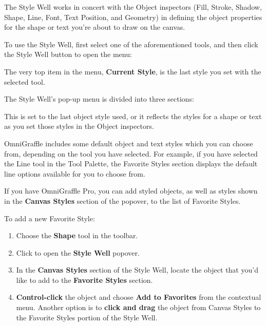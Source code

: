 \documentclass[../main.tex]{subfiles}
\begin{document}
The Style Well works in concert with the Object inspectors (Fill, Stroke, Shadow, Shape, Line,
Font, Text Position, and Geometry) in defining the object properties for the shape or text
you're about to draw on the canvas.

To use the Style Well, first select one of the aforementioned tools, and then click the Style
Well button to open the menu:


The very top item in the menu, \textbf{Current Style}, is the last style you set with the
selected tool.

The Style Well's pop-up menu is divided into three sections:

\begin{description}[style=nextline]
  \item[{\textbf{Current Style}}] This is set to the last object style used, or it reflects the
    styles for a shape or text as you set those styles in the Object inspectors.
  \item[{\textbf{Favorite Styles}}] OmniGraffle includes some default object and text styles
    which you can choose from, depending on the tool you have selected. For example, if you have
    selected the Line tool in the Tool Palette, the Favorite Styles section displays the default
    line options available for you to choose from.

    \begin{ogpro}
      If you have OmniGraffle Pro, you can add styled objects, as well as styles shown in the
      \textbf{Canvas Styles} section of the popover, to the list of Favorite Styles.

      To add a new Favorite Style:

      \begin{enumerate}
        \item Choose the \textbf{Shape} tool in the toolbar.
        \item Click to open the \textbf{Style Well} popover.
        \item In the \textbf{Canvas Styles} section of the Style Well, locate the object that
          you'd like to add to the \textbf{Favorite Styles} section.
        \item \textbf{Control-click} the object and choose \textbf{Add to Favorites} from the
          contextual menu. Another option is to \textbf{click and drag} the object from Canvas
          Styles to the Favorite Styles portion of the Style Well.
      \end{enumerate}


\end{ogpro}
\end{description}
\end{document}

